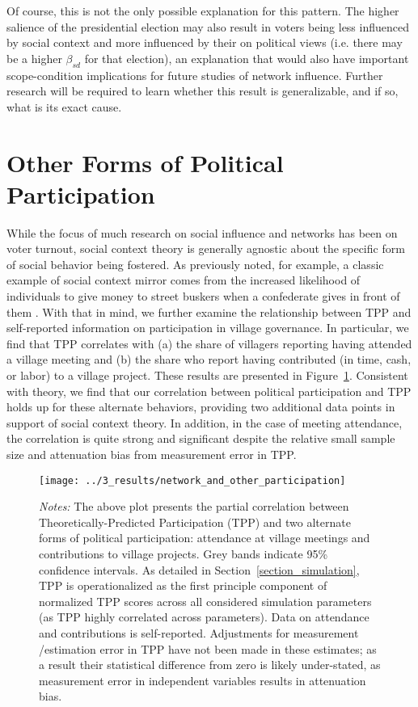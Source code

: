 \documentclass[12pt]{article}
\begin{document}
Of course, this is not the only possible explanation for this pattern. The higher salience of the presidential election may also result in voters being less influenced by social context and more influenced by their on political views (i.e. there may be a higher $\beta_{sd}$ for that election), an explanation that would also have important scope-condition implications for future studies of network influence. Further research will be required to learn whether this result is generalizable, and if so, what is its exact cause.


\section{Other Forms of Political Participation}\label{section_other_political_participation}

While the focus of much research on social influence and networks has been on voter turnout, social context theory is generally agnostic about the specific form of social behavior being fostered. As previously noted, for example, a classic example of social context mirror comes from the increased likelihood of individuals to give money to street buskers when a confederate gives in front of them \citep{Cialdini:2015gt}. With that in mind, we further examine the relationship between TPP and self-reported information on participation in village governance. In particular, we find that TPP correlates with (a) the share of villagers reporting having attended a village meeting and (b) the share who report having contributed (in time, cash, or labor) to a village project. These results are presented in Figure~\ref{figure_otherparticipation}. Consistent with theory, we find that our correlation between political participation and TPP holds up for these alternate behaviors, providing two additional data points in support of social context theory. In addition, in the case of meeting attendance, the correlation is quite strong and significant despite the relative small sample size and attenuation bias from measurement error in TPP.

\begin{figure}[!h]
	\begin{center}
	    \caption{}\label{figure_otherparticipation}
    		\texttt{[image: ../3\_results/network\_and\_other\_participation]}
    \end{center}
	\scriptsize{\emph{Notes:}  The above plot presents the partial correlation between Theoretically-Predicted Participation (TPP) and two alternate forms of political participation: attendance at village meetings and contributions to village projects. Grey bands indicate 95\% confidence intervals. As detailed in Section~\ref{section_simulation}, TPP is operationalized as the first principle component of normalized TPP scores across all considered simulation parameters (as TPP highly correlated across parameters). Data on attendance and contributions is self-reported. Adjustments for measurement /estimation error in TPP have not been made in these estimates; as a result their statistical difference from zero is likely under-stated, as measurement error in independent variables results in attenuation bias.}
\end{figure}
\end{document}
